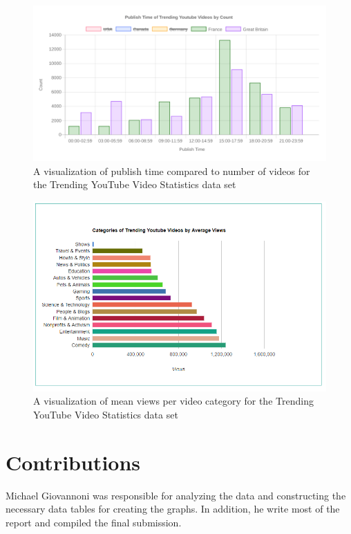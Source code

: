 \documentclass[journal]{vgtc}                %
\begin{document}
\begin{figure}[tb]
	\centering %
	\includegraphics[width=1\columnwidth]{publishtimevideocount}
	\caption{A visualization of publish time compared to number of videos for the Trending YouTube Video Statistics data set}
	\label{fig:publishtimevideocount}
\end{figure}

\begin{figure}[tb]
	\centering %
	\includegraphics[width=1\columnwidth]{category}
	\caption{A visualization of mean views per video category for the Trending YouTube Video Statistics data set}
	\label{fig:category}
\end{figure}

\section{Contributions}
Michael Giovannoni was responsible for analyzing the data and constructing the necessary data tables for creating the graphs. In addition, he write most of the report and compiled the final submission.
\end{document}
